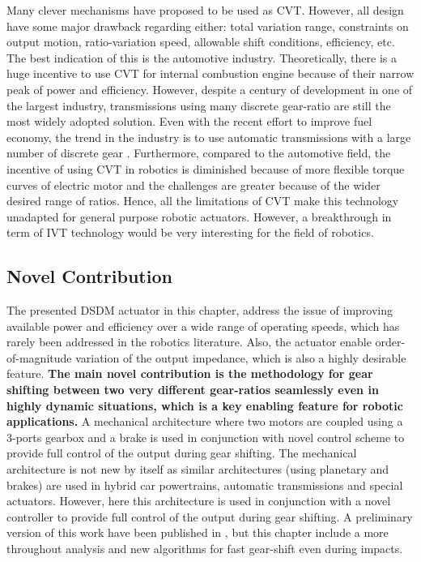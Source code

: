 Many clever mechanisms have proposed to be used as CVT. However, all design have some major drawback regarding either: total variation range, constraints on output motion, ratio-variation speed, allowable shift conditions, efficiency, etc. The best indication of this is the automotive industry. Theoretically, there is a huge incentive to use CVT for internal combustion engine because of their narrow peak of power and efficiency. However, despite a century of development in one of the largest industry, transmissions using many discrete gear-ratio are still the most widely adopted solution. Even with the recent effort to improve fuel economy, the trend in the industry is to use automatic transmissions with a large number of discrete gear \cite{phillips_10-speed_2010}\cite{goleski_multi-speed_2015}. Furthermore, compared to the automotive field, the incentive of using CVT in robotics is diminished because of more flexible torque curves of electric motor and the challenges are greater because of the wider desired range of ratios. Hence, all the limitations of CVT make this technology unadapted for general purpose robotic actuators. However, a breakthrough in term of IVT technology would be very interesting for the field of robotics.

\subsection{Novel Contribution}
The presented DSDM actuator in this chapter, address the issue of improving available power and efficiency over a wide range of operating speeds, which has rarely been addressed in the robotics literature. Also, the actuator enable order-of-magnitude variation of the output impedance, which is also a highly desirable feature.  \textbf{The main novel contribution is the methodology for gear shifting between two very different gear-ratios seamlessly even in highly dynamic situations, which is a key enabling feature for robotic applications.} A mechanical architecture where two motors are coupled using a 3-ports gearbox and a brake is used in conjunction with novel control scheme to provide full control of the output during gear shifting. The mechanical architecture is not new by itself as similar architectures (using planetary and brakes) are used in hybrid car powertrains, automatic transmissions and special actuators. However, here this architecture is used in conjunction with a novel controller to provide full control of the output during gear shifting. A preliminary version of this work have been published in \cite{girard_two-speed_2015}, but this chapter include a more throughout analysis and new algorithms for fast gear-shift even during impacts. 

